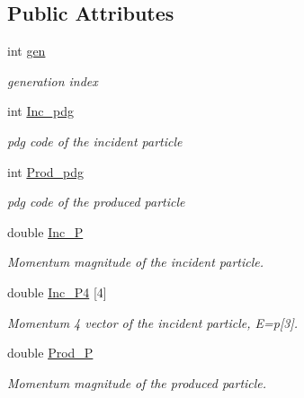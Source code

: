 \subsection*{Public Attributes}
\begin{DoxyCompactItemize}
\item 
int \hyperlink{class_neutrino_flux_reweight_1_1_interaction_data_a66f9342b71e54a2585b25fc3c72d8620}{gen}
\begin{DoxyCompactList}\small\item\em generation index \end{DoxyCompactList}\item 
int \hyperlink{class_neutrino_flux_reweight_1_1_interaction_data_a3dd2f3bb4bc4d092b7ec53906c00473e}{Inc\-\_\-pdg}
\begin{DoxyCompactList}\small\item\em pdg code of the incident particle \end{DoxyCompactList}\item 
int \hyperlink{class_neutrino_flux_reweight_1_1_interaction_data_aaf39f277663067e29fa997b208b09441}{Prod\-\_\-pdg}
\begin{DoxyCompactList}\small\item\em pdg code of the produced particle \end{DoxyCompactList}\item 
double \hyperlink{class_neutrino_flux_reweight_1_1_interaction_data_a0874ed9492a1ab56c775102dc4d0ad40}{Inc\-\_\-\-P}
\begin{DoxyCompactList}\small\item\em Momentum magnitude of the incident particle. \end{DoxyCompactList}\item 
double \hyperlink{class_neutrino_flux_reweight_1_1_interaction_data_a0f74cee2bb5b42e953d6e5f7c6e06920}{Inc\-\_\-\-P4} \mbox{[}4\mbox{]}
\begin{DoxyCompactList}\small\item\em Momentum 4 vector of the incident particle, E=p\mbox{[}3\mbox{]}. \end{DoxyCompactList}\item 
double \hyperlink{class_neutrino_flux_reweight_1_1_interaction_data_a3fc5ae6cdef5d7883442abed079cc107}{Prod\-\_\-\-P}
\begin{DoxyCompactList}\small\item\em Momentum magnitude of the produced particle. \end{DoxyCompactList}\item 

\end{DoxyCompactItemize}
